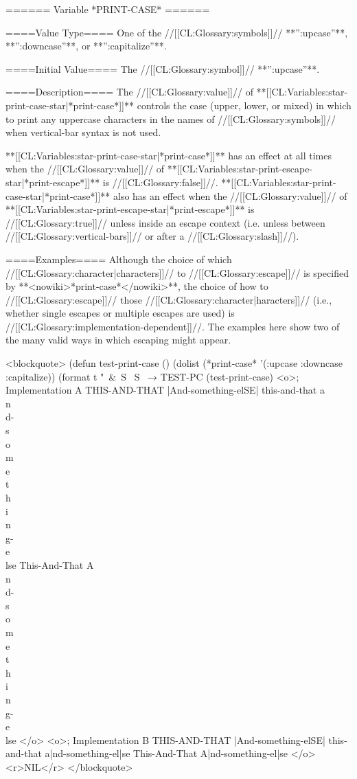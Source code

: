 ====== Variable *PRINT-CASE* ======

====Value Type====
One of the //[[CL:Glossary:symbols]]// **'':upcase''**, **'':downcase''**, or **'':capitalize''**.

====Initial Value====
The //[[CL:Glossary:symbol]]// **'':upcase''**.

====Description====
The //[[CL:Glossary:value]]// of **[[CL:Variables:star-print-case-star|*print-case*]]** controls the case (upper, lower, or mixed) in which to print any uppercase characters in the names of //[[CL:Glossary:symbols]]// when vertical-bar syntax is not used.

**[[CL:Variables:star-print-case-star|*print-case*]]** has an effect at all times when the //[[CL:Glossary:value]]// of **[[CL:Variables:star-print-escape-star|*print-escape*]]** is //[[CL:Glossary:false]]//. **[[CL:Variables:star-print-case-star|*print-case*]]** also has an effect when the //[[CL:Glossary:value]]// of **[[CL:Variables:star-print-escape-star|*print-escape*]]** is //[[CL:Glossary:true]]// unless inside an escape context (i.e. unless between //[[CL:Glossary:vertical-bars]]// or after a //[[CL:Glossary:slash]]//).

====Examples====
Although the choice of which //[[CL:Glossary:character|characters]]// to //[[CL:Glossary:escape]]// is specified by **<nowiki>*print-case*</nowiki>**, the choice of how to //[[CL:Glossary:escape]]// those //[[CL:Glossary:character|haracters]]// (i.e., whether single escapes or multiple escapes are used) is //[[CL:Glossary:implementation-dependent]]//. The examples here show two of the many valid ways in which escaping might appear. 

<blockquote> 
(defun test-print-case ()
  (dolist (*print-case* '(:upcase :downcase :capitalize)) 
    (format t "~&~S ~S~%
    → TEST-PC 
(test-print-case) 
<o>; Implementation A
THIS-AND-THAT |And-something-elSE|
this-and-that a\\n\\d-\\s\\o\\m\\e\\t\\h\\i\\n\\g-\\e\\lse
This-And-That A\\n\\d-\\s\\o\\m\\e\\t\\h\\i\\n\\g-\\e\\lse </o>
<o>; Implementation B
THIS-AND-THAT |And-something-elSE|
this-and-that a|nd-something-el|se
This-And-That A|nd-something-el|se </o>
<r>NIL</r> 
</blockquote>


